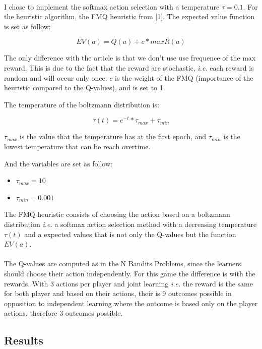 \documentclass[letterpaper]{article}
\begin{document}
\paragraph{}


I chose to implement the softmax action selection with a temperature
$\tau = 0.1$. For the heuristic algorithm, the FMQ heuristic from
[1]. The expected value function is set as follow:

$$
EV(a) = Q(a) + c * maxR(a)
$$

The only difference with the article is that we don't use use frequence of
the max reward. This is due to the fact that the reward are stochastic,
\textit{i.e.} each reward is random and will occur only once. $c$ is the
weight of the FMQ (importance of the heuristic compared
to the Q-values), and is set to 1.

The temperature of the boltzmann distribution is:

$$
\tau(t) = e^{-t} * \tau_{max} + \tau_{min}
$$

$\tau_{max}$ is the value that the temperature has at the first epoch, and
$\tau_{min}$ is the lowest temperature that can be reach overtime.

And the variables are set as follow:

\begin{itemize}
  \item $\tau_{max} = 10$
  \item $\tau_{min} = 0.001$
\end{itemize}

The FMQ heuristic consists of choosing the action based on a boltzmann
distribution \textit{i.e.} a softmax action selection method with
a decreasing temperature $\tau(t)$ and a expected values that is not only the
Q-values but the function $EV(a)$.

\paragraph{}

The Q-values are computed as in the N Bandits Problems, since the
learners should choose their action independently. For this game the difference
is with the rewards. With 3 actions per player and joint learning \textit{i.e.}
the reward is the same for both player and based on their actions,
their is 9 outcomes possible in opposition to independent learning where
the outcome is based only on the player actions, therefore 3 outcomes
possible.

\subsection{Results}
\end{document}
